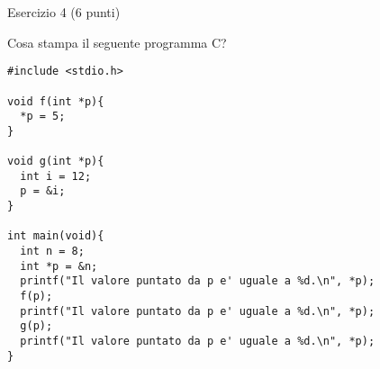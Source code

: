 \documentclass[12pt]{article}
\begin{document}
\vspace*{1ex}

\begin{center}
{\Large Esercizio 4} (6 punti)
\end{center}

\noindent Cosa stampa il seguente programma C?

\begin{lstlisting}
#include <stdio.h>

void f(int *p){
  *p = 5;
}

void g(int *p){
  int i = 12;
  p = &i;
}

int main(void){
  int n = 8;
  int *p = &n;
  printf("Il valore puntato da p e' uguale a %d.\n", *p);
  f(p);
  printf("Il valore puntato da p e' uguale a %d.\n", *p);
  g(p);
  printf("Il valore puntato da p e' uguale a %d.\n", *p);
}
\end{lstlisting}
\end{document}
